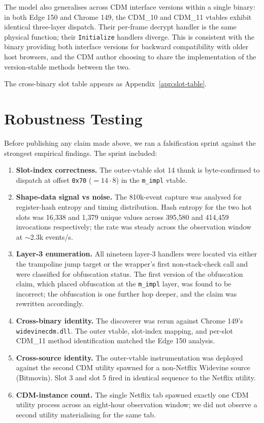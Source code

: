 \documentclass[11pt,letterpaper]{article}
\begin{document}
\noindent The model also generalises across CDM interface versions
within a single binary: in both Edge 150 and Chrome 149, the CDM\_10
and CDM\_11 vtables exhibit identical three-layer dispatch. Their
per-frame decrypt handler is the same physical function; their
\texttt{Initialize} handlers diverge. This is consistent with the
binary providing both interface versions for backward compatibility
with older host browsers, and the CDM author choosing to share the
implementation of the version-stable methods between the two.

The cross-binary slot table appears as Appendix~\ref{app:slot-table}.

\section{Robustness Testing}
\label{sec:robustness}

Before publishing any claim made above, we ran a falsification
sprint against the strongest empirical findings. The sprint
included:

\begin{enumerate}[itemsep=2pt,topsep=2pt]
  \item \textbf{Slot-index correctness.} The outer-vtable slot 14
        thunk is byte-confirmed to dispatch at offset \texttt{0x70}
        ($= 14 \cdot 8$) in the \texttt{m\_impl} vtable.
  \item \textbf{Shape-data signal vs noise.} The 810k-event capture
        was analysed for register-hash entropy and timing
        distribution. Hash entropy for the two hot slots was 16{,}338
        and 1{,}379 unique values across 395{,}580 and 414{,}459
        invocations respectively; the rate was steady across the
        observation window at $\sim$2.3k events/s.
  \item \textbf{Layer-3 enumeration.} All nineteen layer-3 handlers
        were located via either the trampoline jump target or the
        wrapper's first non-stack-check call and were classified for
        obfuscation status. The first version of the obfuscation
        claim, which placed obfuscation at the \texttt{m\_impl}
        layer, was found to be incorrect; the obfuscation is one
        further hop deeper, and the claim was rewritten accordingly.
  \item \textbf{Cross-binary identity.} The discoverer was rerun
        against Chrome 149's \texttt{widevinecdm.dll}. The outer
        vtable, slot-index mapping, and per-slot CDM\_11 method
        identification matched the Edge 150 analysis.
  \item \textbf{Cross-source identity.} The outer-vtable
        instrumentation was deployed against the second CDM utility
        spawned for a non-Netflix Widevine source (Bitmovin). Slot 3
        and slot 5 fired in identical sequence to the Netflix
        utility.
  \item \textbf{CDM-instance count.} The single Netflix tab spawned
        exactly one CDM utility process across an eight-hour
        observation window; we did not observe a second utility
        materialising for the same tab.
\end{enumerate}
\end{document}
